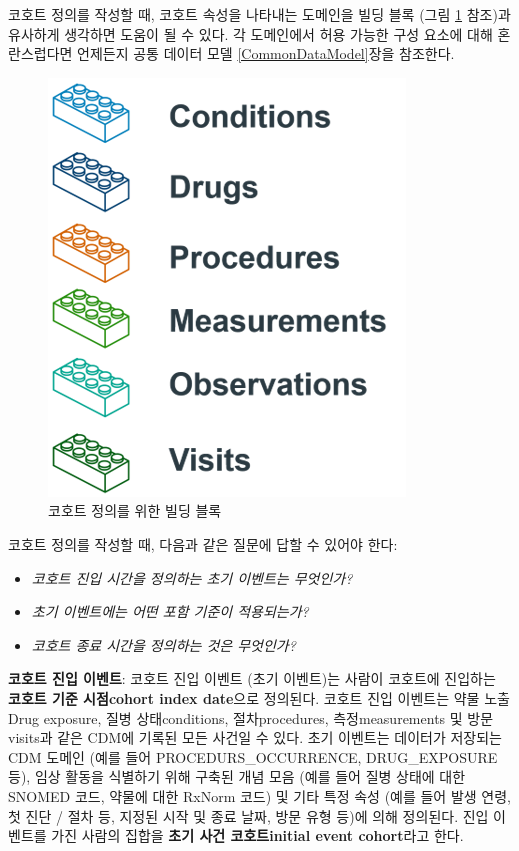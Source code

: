 \documentclass[10.5pt]{book}
\providecommand{\tightlist}{%
  \setlength{\itemsep}{0pt}\setlength{\parskip}{0pt}}
\theoremstyle{definition}
\theoremstyle{definition}
\theoremstyle{definition}
\theoremstyle{remark}
\begin{document}
코호트 정의를 작성할 때, 코호트 속성을 나타내는 도메인을 빌딩 블록 (그림
\ref{fig:cohortLegos} 참조)과 유사하게 생각하면 도움이 될 수 있다. 각
도메인에서 허용 가능한 구성 요소에 대해 혼란스럽다면 언제든지 공통
데이터 모델 \ref{CommonDataModel}장을 참조한다.

\begin{figure}

{\centering \includegraphics[width=0.5\linewidth]{images/Cohorts/cohort-legos} 

}

\caption{코호트 정의를 위한 빌딩 블록}\label{fig:cohortLegos}
\end{figure}

코호트 정의를 작성할 때, 다음과 같은 질문에 답할 수 있어야 한다:

\begin{itemize}
\tightlist
\item
  \emph{코호트 진입 시간을 정의하는 초기 이벤트는 무엇인가?}
\item
  \emph{초기 이벤트에는 어떤 포함 기준이 적용되는가?}
\item
  \emph{코호트 종료 시간을 정의하는 것은 무엇인가?}
\end{itemize}

\textbf{코호트 진입 이벤트}: 코호트 진입 이벤트 (초기 이벤트)는 사람이
코호트에 진입하는 \textbf{코호트 기준 시점cohort index date}으로
정의된다. 코호트 진입 이벤트는 약물 노출Drug exposure, 질병
상태conditions, 절차procedures, 측정measurements 및 방문visits과 같은
CDM에 기록된 모든 사건일 수 있다. 초기 이벤트는 데이터가 저장되는 CDM
도메인 (예를 들어 PROCEDURS\_OCCURRENCE, DRUG\_EXPOSURE 등), 임상 활동을
식별하기 위해 구축된 개념 모음 (예를 들어 질병 상태에 대한 SNOMED 코드,
약물에 대한 RxNorm 코드) 및 기타 특정 속성 (예를 들어 발생 연령, 첫 진단
/ 절차 등, 지정된 시작 및 종료 날짜, 방문 유형 등)에 의해 정의된다. 진입
이벤트를 가진 사람의 집합을 \textbf{초기 사건 코호트initial event
cohort}라고 한다. 
\end{document}
